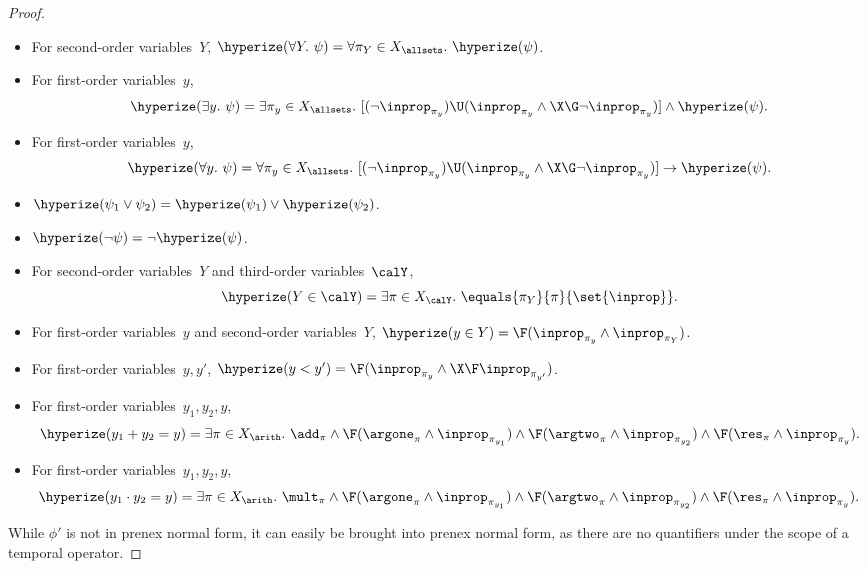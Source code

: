 \begin{proof}
\begin{itemize}
    \item For second-order variables~$Y$, $\hyperize(\forall Y.\ \psi) = \forall \pi_Y \in X_\allsets.\ \hyperize(\psi)$.
    
    \item For first-order variables~$y$, \[\hyperize(\exists y.\ \psi) = \exists \pi_y \in X_\allsets.\  [(\neg \inprop_{\pi_y}) \U (\inprop_{\pi_y}\wedge \X\G\neg\inprop_{\pi_y})] \wedge \hyperize(\psi).\]
    
    \item For first-order variables~$y$, \[\hyperize(\forall y.\ \psi) = \forall \pi_y \in X_\allsets.\ [(\neg \inprop_{\pi_y}) \U (\inprop_{\pi_y}\wedge \X\G\neg\inprop_{\pi_y})] \rightarrow \hyperize(\psi).\]
    
    \item $\hyperize(\psi_1 \vee \psi_2) = \hyperize(\psi_1) \vee \hyperize(\psi_2)$.
    
    \item $\hyperize(\neg \psi) = \neg \hyperize(\psi)$.

    \item For second-order variables~$Y$ and third-order variables~$\calY$, \[\hyperize(Y \in \calY) = \exists \pi \in X_{\calY}.\ \equals{\pi_Y}{\pi}{\set{\inprop}}.\]

    \item For first-order variables~$y$ and second-order variables~$Y$, $\hyperize(y \in Y) = \F(\inprop_{\pi_y} \wedge \inprop_{\pi_{Y}})$.
    
    \item For first-order variables~$y,y'$, $\hyperize(y < y') = \F(\inprop_{\pi_y} \wedge \X\F\inprop_{\pi_{y'}})$.
    
    \item For first-order variables~$y_1,y_2, y$, \[\hyperize(y_1 + y_2 = y) = \exists \pi \in X_\arith.\ \add_{\pi} \wedge 
    \F(\argone_{\pi} \wedge \inprop_{\pi_{y_1}}) \wedge 
    \F(\argtwo_{\pi} \wedge \inprop_{\pi_{y_2}}) \wedge
    \F(\res_{\pi} \wedge \inprop_{\pi_y}).\]

    \item For first-order variables~$y_1,y_2, y$, \[\hyperize(y_1 \cdot y_2 = y) = \exists \pi \in X_\arith.\ \mult_{\pi} \wedge 
    \F(\argone_{\pi} \wedge \inprop_{\pi_{y_1}}) \wedge 
    \F(\argtwo_{\pi} \wedge \inprop_{\pi_{y_2}}) \wedge
    \F(\res_{\pi} \wedge \inprop_{\pi_y}).\]

\end{itemize}
While $\phi'$ is not in prenex normal form, it can easily be brought into prenex normal form, as there are no quantifiers under the scope of a temporal operator.


\end{proof}
